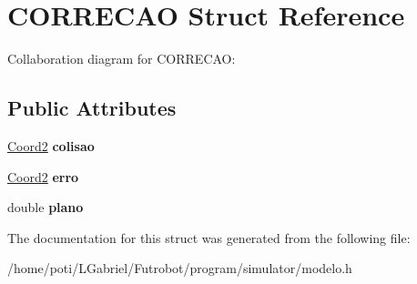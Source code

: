 \hypertarget{structCORRECAO}{}\section{C\+O\+R\+R\+E\+C\+AO Struct Reference}
\label{structCORRECAO}


Collaboration diagram for C\+O\+R\+R\+E\+C\+AO\+:
\subsection*{Public Attributes}
\begin{DoxyCompactItemize}
\item 
\hyperlink{structCoord2}{Coord2} {\bfseries colisao}\hypertarget{structCORRECAO_a7bc135c6d55d74f48d0fb99cdf12942f}{}\label{structCORRECAO_a7bc135c6d55d74f48d0fb99cdf12942f}

\item 
\hyperlink{structCoord2}{Coord2} {\bfseries erro}\hypertarget{structCORRECAO_a4471a85ab9cbcd0ed55d22c1cfeccc45}{}\label{structCORRECAO_a4471a85ab9cbcd0ed55d22c1cfeccc45}

\item 
double {\bfseries plano}\hypertarget{structCORRECAO_afdc0eeae9ebd95457cbe5700b60fbc0c}{}\label{structCORRECAO_afdc0eeae9ebd95457cbe5700b60fbc0c}

\end{DoxyCompactItemize}


The documentation for this struct was generated from the following file\+:\begin{DoxyCompactItemize}
\item 
/home/poti/\+L\+Gabriel/\+Futrobot/program/simulator/modelo.\+h\end{DoxyCompactItemize}
